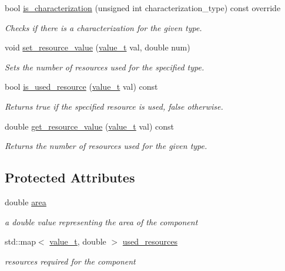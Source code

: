 \begin{DoxyCompactItemize}
bool \hyperlink{classclb__model_a409409e7c08050412c0153d376ce50ec}{is\+\_\+characterization} (unsigned int characterization\+\_\+type) const override
\begin{DoxyCompactList}\small\item\em Checks if there is a characterization for the given type. \end{DoxyCompactList}\item 
void \hyperlink{classclb__model_a211bf207a1e3bb6dd4a1ab9d8d2413b4}{set\+\_\+resource\+\_\+value} (\hyperlink{classclb__model_a11a81df139e5752535807c276badbe21}{value\+\_\+t} val, double num)
\begin{DoxyCompactList}\small\item\em Sets the number of resources used for the specified type. \end{DoxyCompactList}\item 
bool \hyperlink{classclb__model_a9510accc931b043ffd9903f39c9c33cf}{is\+\_\+used\+\_\+resource} (\hyperlink{classclb__model_a11a81df139e5752535807c276badbe21}{value\+\_\+t} val) const
\begin{DoxyCompactList}\small\item\em Returns true if the specified resource is used, false otherwise. \end{DoxyCompactList}\item 
double \hyperlink{classclb__model_ae64d71f3b4302b41235c66b98075639e}{get\+\_\+resource\+\_\+value} (\hyperlink{classclb__model_a11a81df139e5752535807c276badbe21}{value\+\_\+t} val) const
\begin{DoxyCompactList}\small\item\em Returns the number of resources used for the given type. \end{DoxyCompactList}\end{DoxyCompactItemize}
\subsection*{Protected Attributes}
\begin{DoxyCompactItemize}
\item 
double \hyperlink{classclb__model_a5f5d1352275ca153641e67dd778cd3e7}{area}
\begin{DoxyCompactList}\small\item\em a double value representing the area of the component \end{DoxyCompactList}\item 
std\+::map$<$ \hyperlink{classclb__model_a11a81df139e5752535807c276badbe21}{value\+\_\+t}, double $>$ \hyperlink{classclb__model_a353dd5b03f3085fd4571f966c96c814c}{used\+\_\+resources}
\begin{DoxyCompactList}\small\item\em resources required for the component \end{DoxyCompactList}\end{DoxyCompactItemize}
